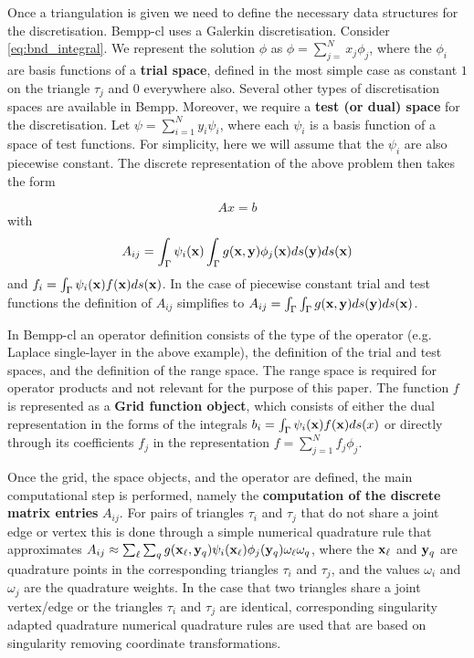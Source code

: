 Once a triangulation is given we need to define the necessary data structures for the discretisation. Bempp-cl uses a Galerkin discretisation. Consider \eqref{eq:bnd_integral}. We represent the solution $\phi$ as $\phi=\sum_{j=}^N x_j\phi_j$, where the $\phi_i$ are basis functions of a \textbf{trial space}, defined in the most simple case as constant $1$ on the triangle $\tau_j$ and $0$ everywhere also. Several other types of discretisation spaces are available in Bempp. Moreover, we require a \textbf{test (or dual) space} for the discretisation. Let $\psi=\sum_{i=1}^Ny_i \psi_i$, where each $\psi_i$ is a basis function of a space of test functions. For simplicity, here we will assume that the $\psi_i$ are also piecewise constant. The discrete representation of the above problem then takes the form

$$
Ax = b
$$
with 
$$
A_{ij} = \int_{\Gamma}\psi_i(\mathbf{x})\int_{\Gamma}g(\mathbf{x}, \mathbf{y})\phi_j(\mathbf{x})ds(\mathbf{y})ds(\mathbf{x})
$$
and $f_i = \int_{\Gamma}\psi_i(\mathbf{x})f(\mathbf{x})ds(\mathbf{x})$. In the case of piecewise constant trial and test functions the definition of $A_{ij}$ simplifies to $A_{ij} = \int_{\Gamma}\int_{\Gamma}g(\mathbf{x}, \mathbf{y})ds(\mathbf{y})ds(\mathbf{x})$.

In Bempp-cl an operator definition consists of the type of the operator (e.g. Laplace single-layer in the above example),
the definition of the trial and test spaces, and the definition of the range space. The range space is required for operator
products and not relevant for the purpose of this paper. The function $f$ is represented as a \textbf{Grid function object}, which
consists of either the dual representation in the forms of the integrals $b_i = \int_{\Gamma}\psi_i(\mathbf{x})f(\mathbf{x})ds(x)$ or directly through its coefficients $f_j$ in the representation $f=\sum_{j=1}^N f_j\phi_j$.

Once the grid, the space objects, and the operator are defined, the main computational step is performed, namely the \textbf{computation of the discrete matrix entries} $A_{ij}$. For pairs of triangles $\tau_i$ and $\tau_j$ that do not share a joint edge or vertex this is done through a simple numerical quadrature rule that approximates $A_{ij}\approx \sum_{\ell}\sum_{q} g(\mathbf{x}_\ell, \mathbf{y}_q)\psi_i(\mathbf{x}_\ell)\phi_j(\mathbf{y}_q)\omega_\ell\omega_q$, where the $\mathbf{x}_\ell$ and $\mathbf{y}_q$ are quadrature points in the corresponding triangles $\tau_i$ and $\tau_j$, and the values $\omega_i$ and $\omega_j$ are the quadrature weights. In the case that two triangles share a joint vertex/edge or the triangles $\tau_i$ and $\tau_j$ are identical, corresponding singularity adapted quadrature numerical quadrature rules are used that are based on singularity removing coordinate transformations.

